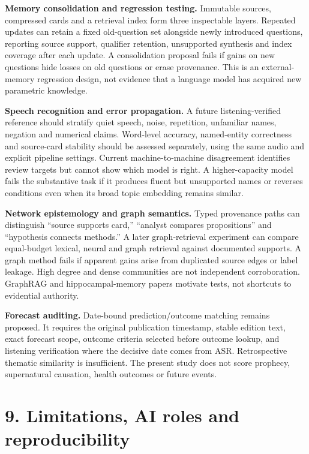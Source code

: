 \documentclass[
  10pt,
]{article}
\begin{document}
\textbf{Memory consolidation and regression testing.} Immutable sources,
compressed cards and a retrieval index form three inspectable layers.
Repeated updates can retain a fixed old-question set alongside newly
introduced questions, reporting source support, qualifier retention,
unsupported synthesis and index coverage after each update. A
consolidation proposal fails if gains on new questions hide losses on
old questions or erase provenance. This is an external-memory regression
design, not evidence that a language model has acquired new parametric
knowledge.

\textbf{Speech recognition and error propagation.} A future
listening-verified reference should stratify quiet speech, noise,
repetition, unfamiliar names, negation and numerical claims. Word-level
accuracy, named-entity correctness and source-card stability should be
assessed separately, using the same audio and explicit pipeline
settings. Current machine-to-machine disagreement identifies review
targets but cannot show which model is right. A higher-capacity model
fails the substantive task if it produces fluent but unsupported names
or reverses conditions even when its broad topic embedding remains
similar.

\textbf{Network epistemology and graph semantics.} Typed provenance
paths can distinguish ``source supports card,'' ``analyst compares
propositions'' and ``hypothesis connects methods.'' A later
graph-retrieval experiment can compare equal-budget lexical, neural and
graph retrieval against documented supports. A graph method fails if
apparent gains arise from duplicated source edges or label leakage. High
degree and dense communities are not independent corroboration. GraphRAG
and hippocampal-memory papers motivate tests, not shortcuts to
evidential authority.

\textbf{Forecast auditing.} Date-bound prediction/outcome matching
remains proposed. It requires the original publication timestamp, stable
edition text, exact forecast scope, outcome criteria selected before
outcome lookup, and listening verification where the decisive date comes
from ASR. Retrospective thematic similarity is insufficient. The present
study does not score prophecy, supernatural causation, health outcomes
or future events.

\section{9. Limitations, AI roles and
reproducibility}\label{limitations-ai-roles-and-reproducibility}
\end{document}
